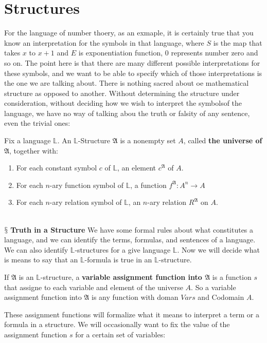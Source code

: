 \documentclass[9pt,a4paper, twocolumn]{article}
\newcommand{\newpoint}[1]{\ \\ \indent$\mathsection$ \textbf{#1}}
\newcommand{\curveL}{\mathbb{L} }
\newcommand{\curveA}{\mathfrak{A} }
\begin{document}
    \section*{Structures}
        For the language of number thoery, as an exmaple, it is certainly true that you know an interpretation for the symbols in that language, where $S$ is the map that takes $x$ to $x+1$ and $E$ is exponentiation function, 0 represents number zero and so on. The point here is that there are many different possible interpretations for these symbols, and we want to be able to specify which of those interpretations is the one we are talking about. There is nothing sacred about oe mathematical structure as opposed to another. Without determining the structure under consideration, without deciding how we wish to interpret the symbolsof the language, we have no way of talking abou the truth or falsity of any sentence, even the trivial ones:
        \begin{define}
            Fix a language $\curveL$. An $\curveL$-Structure $\curveA$ is a nonempty set $A$, called \textbf{the universe of} $\curveA$, together with:
            \begin{enumerate}
                \item For each constant symbol $c$ of $\curveL$, an element $c^\curveA$ of $A$.
                \item For each $n$-ary function symbol of $\curveL$, a function $f^\curveA: A^n \rightarrow A$
                \item For each $n$-ary relation symbol of $\curveL$, an $n$-ary relation $R^\curveA$ on $A$.
            \end{enumerate}
        \end{define}
        \newpoint{Truth in a Structure}
            We have some formal rules about what constitutes a language, and we can identify the terms, formulas, and sentences of a language. We can also identify $\curveL$-structures for a give language $\curveL$. Now we will decide what is means to say that an $\curveL$-formula is true in an $\curveL$-structure.
            \begin{define}
                If $\curveA$ is an $\curveL$-structure, a \textbf{variable assignment function into $\curveA$} is a function $s$ that assigne to each variable and element of the universe $A$. So a variable assignment function into $\curveA$ is any function with doman $Vars$ and Codomain $A$.
            \end{define}
            These assignment functions will formalize what it means to interpret a term or a formula in a structure. We will occasionally want to fix the value of the assignment function $s$ for a certain set of variables:
\end{document}
